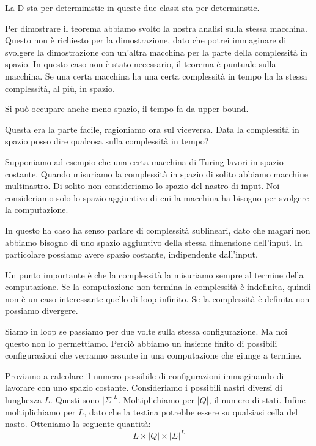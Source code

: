 La D sta per deterministic in queste due classi sta per determinstic.

Per dimostrare il teorema abbiamo svolto la nostra analisi sulla stessa macchina. Questo non è
richiesto per la dimostrazione, dato che potrei immaginare di svolgere la dimostrazione con un'altra
macchina per la parte della complessità in spazio. In questo caso non è stato necessario, il
teorema è puntuale sulla macchina. Se una certa macchina ha una certa complessità in tempo ha la
stessa complessità, al più, in spazio.

Si può occupare anche meno spazio, il tempo fa da upper bound.

Questa era la parte facile, ragioniamo ora sul viceversa. Data la complessità in spazio posso dire
qualcosa sulla complessità in tempo?

Supponiamo ad esempio che una certa macchina di Turing lavori in spazio costante. Quando misuriamo
la complessità in spazio di solito abbiamo macchine multinastro. Di solito non consideriamo lo
spazio del nastro di input. Noi consideriamo solo lo spazio aggiuntivo di cui la macchina ha bisogno
per svolgere la computazione.

In questo ha caso ha senso parlare di complessità sublineari, dato che magari non abbiamo bisogno
di uno spazio aggiuntivo della stessa dimensione dell'input. In particolare possiamo avere spazio
costante, indipendente dall'input.

Un punto importante è che la complessità la misuriamo sempre al termine della computazione. Se la
computazione non termina la complessità è indefinita, quindi non è un caso interessante quello di
loop infinito. Se la complessità è definita non possiamo divergere.

Siamo in loop se passiamo per due volte sulla stessa configurazione. Ma noi questo non lo
permettiamo. Perciò abbiamo un insieme finito di possibili configurazioni che verranno assunte in
una computazione che giunge a termine.

Proviamo a calcolare il numero possibile di configurazioni immaginando di lavorare con uno spazio
costante. Consideriamo i possibili nastri diversi di lunghezza $L$. Questi sono $|\Sigma|^{L}$.
Moltiplichiamo per $|Q|$, il numero di stati. Infine moltiplichiamo per $L$, dato che la testina
potrebbe essere su qualsiasi cella del nasto. Otteniamo la seguente quantità:
\begin{equation*}
    L \times |Q| \times |\Sigma|^{L}
\end{equation*}


